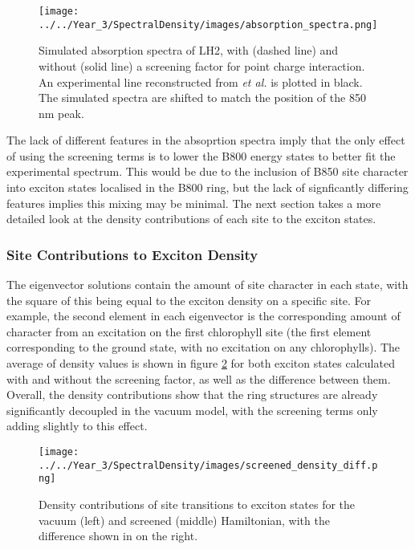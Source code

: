 \begin{figure}
    \centering
    \texttt{[image: ../../Year\_3/SpectralDensity/images/absorption\_spectra.png]}
    \label{fig:LH2_abs_spec}
    \caption{Simulated absorption spectra of LH2, with (dashed line) and without 
    (solid line) a screening factor for point charge interaction. An experimental
    line reconstructed from \emph{et al.} is plotted in black. The simulated spectra
    are shifted to match the position of the 850 nm peak.}
\end{figure}

The lack of different features in the absoprtion spectra imply that the only effect
of using the screening terms is to lower the B800 energy states to better fit the
experimental spectrum. This would be due to the inclusion of B850 site character
into exciton states localised in the B800 ring, but the lack of signficantly differing
features implies this mixing may be minimal. The next section takes a more detailed
look at the density contributions of each site to the exciton states.

\subsubsection{Site Contributions to Exciton Density}
\label{subsubsec:site_dens}

The eigenvector solutions contain the amount of site character in each state, with
the square of this being equal to the exciton density on a specific site. For example,
the second element in each eigenvector is the corresponding amount of character 
from an excitation on the first chlorophyll site (the first element corresponding
to the ground state, with no excitation on any chlorophylls). The average of density
values is shown in figure \ref{fig:LH2_density} for both exciton states calculated
with and without the screening factor, as well as the difference between them. 
Overall, the density contributions show that the ring structures are already significantly
decoupled in the vacuum model, with the screening terms only adding slightly to 
this effect.

\begin{figure}
    \centering
    \texttt{[image: ../../Year\_3/SpectralDensity/images/screened\_density\_diff.png]}
    \label{fig:LH2_density}
    \caption{Density contributions of site transitions to exciton states for the
    vacuum (left) and screened (middle) Hamiltonian, with the difference shown in
    on the right.}
\end{figure}

